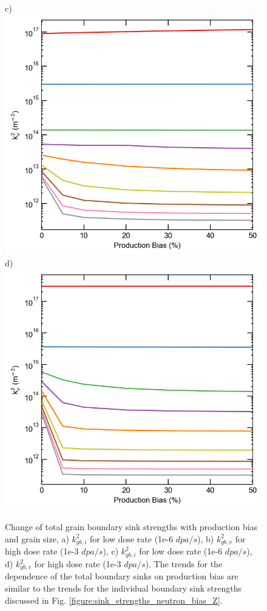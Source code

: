 \documentclass[utf8]{frontiersSCNS} %
\begin{document}
\begin{figure}[h!]
        c)\includegraphics[scale=0.55]{Fig11_c}
        d)\includegraphics[scale=0.55]{Fig11_d}
        \caption{Change of total grain boundary sink strengths with production bias and grain size, a) $k_{gb,i}^2$ for low dose rate (1e-6 $dpa/s$), b) $k_{gb,v}^2$ for high dose rate (1e-3 $dpa/s$), c) $k_{gb,i}^2$ for low dose rate (1e-6 $dpa/s$), d) $k_{gb,v}^2$ for high dose rate (1e-3 $dpa/s$). The trends for the dependence of the total boundary sinks on production bias are similar to the trends for the individual boundary sink strengths discussed in Fig. \ref{figure:sink_strengths_neutron_bias_Z}.  }
        \label{figure:sink_strengths_neutron_bias_k}
    \end{figure}
\end{document}
